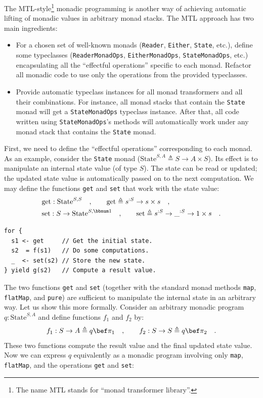 The MTL-style\footnote{The name MTL stands for \textsf{``}monad transformer library\textsf{''}.}
monadic programming is another way
of achieving automatic lifting of monadic values in arbitrary monad
stacks. The MTL approach has two main ingredients:
\begin{itemize}
\item For a chosen set of well-known monads (\lstinline!Reader!, \lstinline!Either!,
\lstinline!State!, etc.), define some typeclasses (\lstinline!ReaderMonadOps!,
\lstinline!EitherMonadOps!, \lstinline!StateMonadOps!, etc.) encapsulating
all the \textsf{``}effectful operations\textsf{''} specific to each monad. Refactor
all monadic code to use only the operations from the provided typeclasses. 
\item Provide automatic typeclass instances for all monad transformers and
all their combinations. For instance, all monad stacks that contain
the \lstinline!State! monad will get a \lstinline!StateMonadOps!
typeclass instance. After that, all code written using \lstinline!StateMonadOps!\textsf{'}s
methods will automatically work under any monad stack that contains
the \lstinline!State! monad.
\end{itemize}
First, we need to define the \textsf{``}effectful operations\textsf{''} corresponding
to each monad. As an example, consider the \lstinline!State! monad
($\text{State}^{S,A}\triangleq S\rightarrow A\times S$). Its effect
is to manipulate an internal state value (of type $S$). The state
can be read or updated; the updated state value is automatically passed
on to the next computation. We may define the functions \lstinline!get!
and \lstinline!set! that work with the state value:
\begin{align*}
 & \text{get}:\text{State}^{S,S}\quad,\quad\quad\text{get}\triangleq s^{:S}\rightarrow s\times s\quad,\\
 & \text{set}:S\rightarrow\text{State}^{S,\bbnum 1}\quad,\quad\quad\text{set}\triangleq s^{:S}\rightarrow\_^{:S}\rightarrow1\times s\quad.
\end{align*}

\begin{lstlisting}
for {
  s1 <- get     // Get the initial state.
  s2  = f(s1)   // Do some computations.
  _  <- set(s2) // Store the new state.
} yield g(s2)   // Compute a result value.
\end{lstlisting}
The two functions \lstinline!get! and \lstinline!set! (together
with the standard monad methods \lstinline!map!, \lstinline!flatMap!,
and \lstinline!pure!) are sufficient to manipulate the internal state
in an arbitrary way. Let us show this more formally. Consider an arbitrary
monadic program $q:\text{State}^{S,A}$ and define functions $f_{1}$
and $f_{2}$ by:
\[
f_{1}:S\rightarrow A\triangleq q\bef\pi_{1}\quad,\quad\quad f_{2}:S\rightarrow S\triangleq q\bef\pi_{2}\quad.
\]
These two functions compute the result value and the final updated
state value. Now we can express $q$ equivalently as a monadic program
involving only \lstinline!map!, \lstinline!flatMap!, and the operations
\lstinline!get! and \lstinline!set!:

